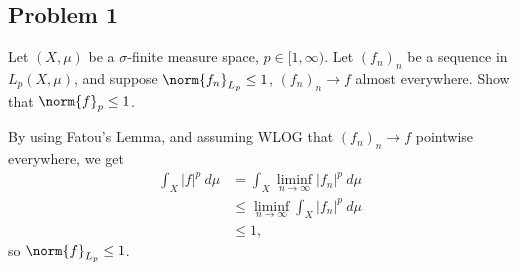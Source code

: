 \documentclass[10pt]{mypackage}
\begin{document}
\subsection{Problem 1}%
\begin{problem}
  Let $\left( X,\mu \right)$ be a $\sigma$-finite measure space, $p\in [1,\infty)$. Let $\left( f_n \right)_n$ be a sequence in $L_p\left( X,\mu \right)$, and suppose $\norm{f_n}_{L_p}\leq 1$, $\left( f_n \right)_n\rightarrow f$ almost everywhere. Show that $\norm{f}_{p}\leq 1$.
\end{problem}
By using Fatou's Lemma, and assuming WLOG that $\left( f_n \right)_n\rightarrow f$ pointwise everywhere, we get
\begin{align*}
  \int_{X}^{} \left\vert f \right\vert^{p}\:d\mu &= \int_{X}^{} \liminf_{n\rightarrow\infty} \left\vert f_n \right\vert^{p}\:d\mu\\
                                                 &\leq \liminf_{n\rightarrow\infty} \int_{X}^{} \left\vert f_n \right\vert^{p}\:d\mu\\
                                                 &\leq 1,
\end{align*}
so $\norm{f}_{L_p}\leq 1$.
\end{document}
